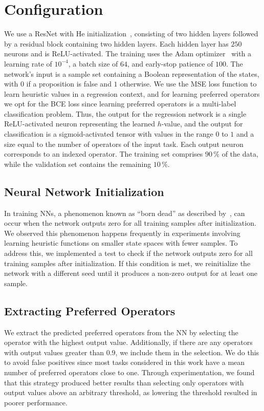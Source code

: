\documentclass[ppgc,diss,english]{iiufrgs}
\begin{document}
\section{Configuration}
\label{sec:exp-configuration}
We use a ResNet with He initialization~\cite{He.etal/2015}, consisting of two hidden layers followed by a residual block containing two hidden layers.
Each hidden layer has $250$ neurons and is ReLU-activated.
The training uses the Adam optimizer~\cite{Kingma.Ba/2015} with a learning rate of $10^{-4}$, a batch size of $64$, and early-stop patience of $100$.
The network's input is a sample set containing a Boolean representation of the states, with $0$ if a proposition is false and $1$ otherwise.
We use the MSE loss function to learn heuristic values in a regression context, and for learning preferred operators we opt for the BCE loss since learning preferred operators is a multi-label classification problem.
Thus, the output for the regression network is a single ReLU-activated neuron representing the learned $h$-value, and the output for classification is a sigmoid-activated tensor with values in the range $0$ to $1$ and a size equal to the number of operators of the input task.
Each output neuron corresponds to an indexed operator. The training set comprises $90\,\%$ of the data, while the validation set contains the remaining $10\,\%$.

\subsection{Neural Network Initialization}
\label{sec:exp-nn-init}
In training NNs, a phenomenon known as ``born dead'' as described by~\citet{Lu.etal/2020}, can occur when the network outputs zero for all training samples after initialization. We observed this phenomenon happens frequently in experiments involving learning heuristic functions on smaller state spaces with fewer samples. To address this, we implemented a test to check if the network outputs zero for all training samples after initialization. If this condition is met, we reinitialize the network with a different seed until it produces a non-zero output for at least one sample.

\subsection{Extracting Preferred Operators}
\label{sec:exp-extracting-pos}
We extract the predicted preferred operators from the NN by selecting the operator with the highest output value. Additionally, if there are any operators with output values greater than $0.9$, we include them in the selection. We do this to avoid false positives since most tasks considered in this work have a mean number of preferred operators close to one. Through experimentation, we found that this strategy produced better results than selecting only operators with output values above an arbitrary threshold, as lowering the threshold resulted in poorer performance.
\end{document}

